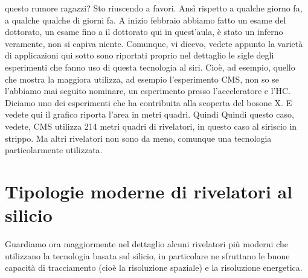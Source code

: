 {questo rumore ragazzi? Sto riuscendo a favori. Ansì rispetto a qualche giorno fa, a qualche qualche di giorni fa. A inizio febbraio abbiamo fatto un esame del dottorato, un esame fino a il dottorato qui in quest'aula, è stato un inferno veramente, non si capiva niente. Comunque, vi dicevo, vedete appunto la varietà di applicazioni qui sotto sono riportati proprio nel dettaglio le sigle degli esperimenti che fanno uso di questa tecnologia al siri. Cioè, ad esempio, quello che mostra la maggiora utilizza, ad esempio l'esperimento CMS, non so se l'abbiamo mai seguito nominare, un esperimento presso l'acceleratore e l'HC. Diciamo uno dei esperimenti che ha contribuita alla scoperta del bosone X. E vedete qui il grafico riporta l'area in metri quadri. Quindi Quindi questo caso, vedete, CMS utilizza 214 metri quadri di rivelatori, in questo caso al siriscio in strippo. Ma altri rivelatori non sono da meno, comunque una tecnologia particolarmente utilizzata.}

\section{Tipologie moderne di rivelatori al silicio}
Guardiamo ora maggiormente nel dettaglio alcuni rivelatori più moderni che utilizzano la tecnologia basata sul silicio, in particolare ne sfruttano le buone capacità di tracciamento (cioè la risoluzione spaziale) e la risoluzione energetica.

